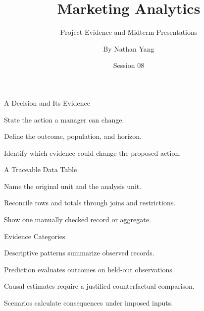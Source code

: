 
\title{Marketing Analytics}
\subtitle{Project Evidence and Midterm Presentations}
\author{By Nathan Yang}
\date{Session 08}

\begin{frame}
\titlepage
\end{frame}
\begin{frame}{A Decision and Its Evidence}
\vfill
\begin{slidebullets}
\item State the action a manager can change.
\item Define the outcome, population, and horizon.
\item Identify which evidence could change the proposed action.
\end{slidebullets}
\vfill
{}
\end{frame}
\begin{frame}{A Traceable Data Table}
\vfill
\begin{slidebullets}
\item Name the original unit and the analysis unit.
\item Reconcile rows and totals through joins and restrictions.
\item Show one manually checked record or aggregate.
\end{slidebullets}
\vfill
{}
\end{frame}
\begin{frame}{Evidence Categories}
\vfill
\begin{slidebullets}
\item Descriptive patterns summarize observed records.
\item Prediction evaluates outcomes on held-out observations.
\item Causal estimates require a justified counterfactual comparison.
\item Scenarios calculate consequences under imposed inputs.
\end{slidebullets}
\vfill
{}
\end{frame}
